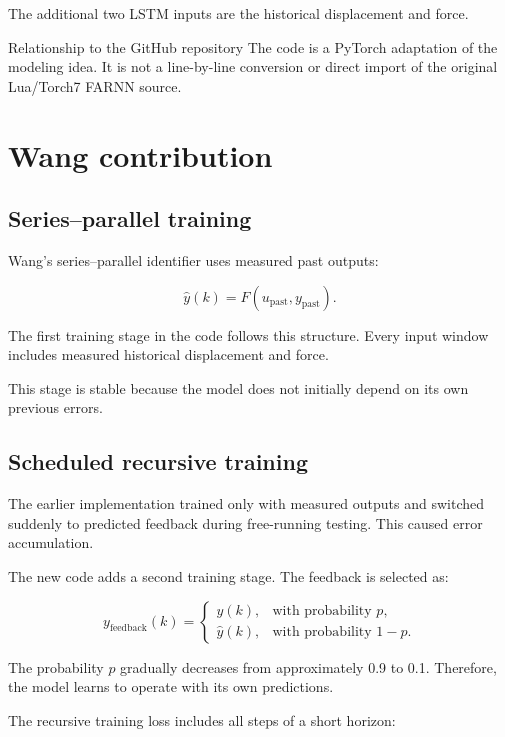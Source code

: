 \documentclass[11pt]{article}
\begin{document}
The additional two LSTM inputs are the historical displacement and force.

\begin{importantbox}{Relationship to the GitHub repository}
The code is a PyTorch adaptation of the modeling idea. It is not a line-by-line conversion or direct import of the original Lua/Torch7 FARNN source.
\end{importantbox}

\section{Wang contribution}

\subsection{Series--parallel training}

Wang's series--parallel identifier uses measured past outputs:

\[
\hat y(k)
=
F\!\left(
u_{\mathrm{past}},
y_{\mathrm{past}}
\right).
\]

The first training stage in the code follows this structure. Every input window includes measured historical displacement and force.

This stage is stable because the model does not initially depend on its own previous errors.

\subsection{Scheduled recursive training}

The earlier implementation trained only with measured outputs and switched suddenly to predicted feedback during free-running testing. This caused error accumulation.

The new code adds a second training stage. The feedback is selected as:

\[
y_{\mathrm{feedback}}(k)=
\begin{cases}
y(k), & \text{with probability }p,\\
\hat y(k), & \text{with probability }1-p.
\end{cases}
\]

The probability $p$ gradually decreases from approximately 0.9 to 0.1. Therefore, the model learns to operate with its own predictions.

The recursive training loss includes all steps of a short horizon:
\end{document}
